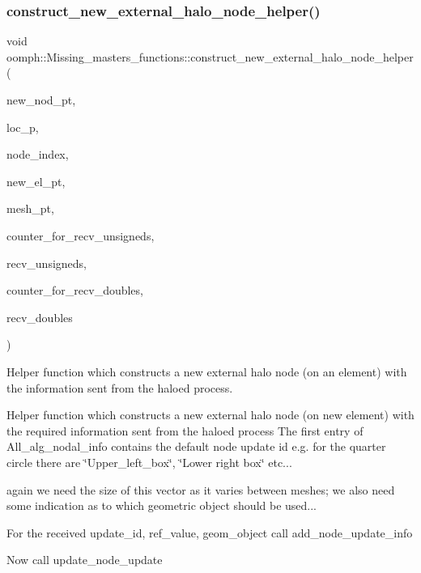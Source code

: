 \subsubsection{\texorpdfstring{construct\+\_\+new\+\_\+external\+\_\+halo\+\_\+node\+\_\+helper()}{construct\_new\_external\_halo\_node\_helper()}}
{\footnotesize\ttfamily void oomph\+::\+Missing\+\_\+masters\+\_\+functions\+::construct\+\_\+new\+\_\+external\+\_\+halo\+\_\+node\+\_\+helper (\begin{DoxyParamCaption}\item[{\hyperlink{classoomph_1_1Node}{Node} $\ast$\&}]{new\+\_\+nod\+\_\+pt,  }\item[{unsigned \&}]{loc\+\_\+p,  }\item[{unsigned \&}]{node\+\_\+index,  }\item[{\hyperlink{classoomph_1_1FiniteElement}{Finite\+Element} $\ast$const \&}]{new\+\_\+el\+\_\+pt,  }\item[{\hyperlink{classoomph_1_1Mesh}{Mesh} $\ast$const \&}]{mesh\+\_\+pt,  }\item[{unsigned \&}]{counter\+\_\+for\+\_\+recv\+\_\+unsigneds,  }\item[{\hyperlink{classoomph_1_1Vector}{Vector}$<$ unsigned $>$ \&}]{recv\+\_\+unsigneds,  }\item[{unsigned \&}]{counter\+\_\+for\+\_\+recv\+\_\+doubles,  }\item[{\hyperlink{classoomph_1_1Vector}{Vector}$<$ double $>$ \&}]{recv\+\_\+doubles }\end{DoxyParamCaption})}



Helper function which constructs a new external halo node (on an element) with the information sent from the haloed process. 

Helper function which constructs a new external halo node (on new element) with the required information sent from the haloed process The first entry of All\+\_\+alg\+\_\+nodal\+\_\+info contains the default node update id e.\+g. for the quarter circle there are \char`\"{}\+Upper\+\_\+left\+\_\+box\char`\"{}, \char`\"{}\+Lower right box\char`\"{} etc...

again we need the size of this vector as it varies between meshes; we also need some indication as to which geometric object should be used...

For the received update\+\_\+id, ref\+\_\+value, geom\+\_\+object call add\+\_\+node\+\_\+update\+\_\+info

Now call update\+\_\+node\+\_\+update 

